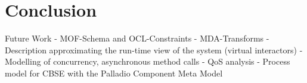 \section{Conclusion}
Future Work
-	MOF-Schema and OCL-Constraints
-	MDA-Transforms
-	Description approximating the run-time view of the system (virtual interactors)
-	Modelling of concurrency, asynchronous method calls
-	QoS analysis
-	Process model for CBSE with the Palladio Component Meta Model

